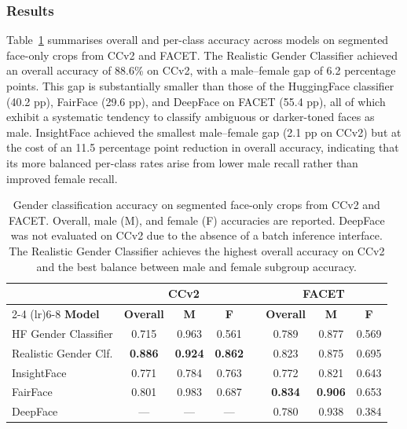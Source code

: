 \subsubsection{Results}
\label{subsubsec:gender_results}

Table~\ref{tab:gender_results} summarises overall and per-class accuracy across models on segmented face-only crops from CCv2 and FACET. The Realistic Gender Classifier achieved an overall accuracy of 88.6\% on CCv2, with a male--female gap of 6.2 percentage points. This gap is substantially smaller than those of the HuggingFace classifier (40.2 pp), FairFace (29.6 pp), and DeepFace on FACET (55.4 pp), all of which exhibit a systematic tendency to classify ambiguous or darker-toned faces as male. InsightFace achieved the smallest male--female gap (2.1 pp on CCv2) but at the cost of an 11.5 percentage point reduction in overall accuracy, indicating that its more balanced per-class rates arise from lower male recall rather than improved female recall.

\begin{table}[H]
	\centering
	\footnotesize
	\begin{tabular}{lccccccc}
		\toprule
		                      & \multicolumn{3}{c}{\textbf{CCv2}} &                & \multicolumn{3}{c}{\textbf{FACET}}                                                     \\
		\cmidrule(lr){2-4} \cmidrule(lr){6-8}
		\textbf{Model}        & \textbf{Overall}                  & \textbf{M}     & \textbf{F}                         &  & \textbf{Overall} & \textbf{M}     & \textbf{F} \\
		\midrule
		HF Gender Classifier  & 0.715                             & 0.963          & 0.561                              &  & 0.789            & 0.877          & 0.569      \\
		Realistic Gender Clf. & \textbf{0.886}                    & \textbf{0.924} & \textbf{0.862}                     &  & 0.823            & 0.875          & 0.695      \\
		InsightFace           & 0.771                             & 0.784          & 0.763                              &  & 0.772            & 0.821          & 0.643      \\
		FairFace              & 0.801                             & 0.983          & 0.687                              &  & \textbf{0.834}   & \textbf{0.906} & 0.653      \\
		DeepFace              & ---                               & ---            & ---                                &  & 0.780            & 0.938          & 0.384      \\
		\bottomrule
	\end{tabular}
	\caption{Gender classification accuracy on segmented face-only crops from CCv2 and FACET.
		Overall, male (M), and female (F) accuracies are reported. DeepFace was not
		evaluated on CCv2 due to the absence of a batch inference interface. The Realistic
		Gender Classifier achieves the highest overall accuracy on CCv2 and the best balance
		between male and female subgroup accuracy.}
	\label{tab:gender_results}
\end{table}



